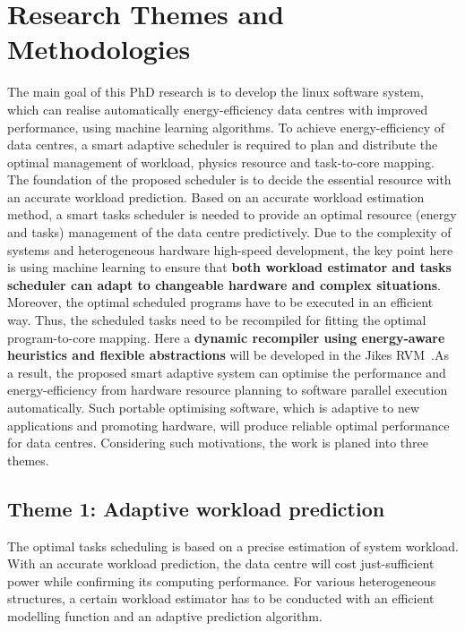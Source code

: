 \section{Research Themes and Methodologies}

The main goal of this PhD research is to develop the linux software system, which can realise automatically energy-efficiency data centres with improved performance, using machine learning algorithms. To achieve energy-efficiency of data centres, a smart adaptive scheduler is required to plan and distribute the optimal management of workload, physics resource and task-to-core mapping. The foundation of the proposed scheduler is to decide the essential resource with an accurate workload prediction. Based on an accurate workload estimation method, a smart tasks scheduler is needed to provide an optimal resource (energy and tasks) management of the data centre predictively. Due to the complexity of systems and heterogeneous hardware high-speed development, the key point here is using machine learning to ensure that \textbf{both workload estimator and tasks scheduler can adapt to changeable hardware and complex situations}. Moreover, the optimal scheduled programs have to be executed in an efficient way. Thus, the scheduled tasks need to be recompiled for fitting the optimal program-to-core mapping. Here a \textbf{dynamic recompiler using energy-aware heuristics and flexible abstractions} will be developed in the Jikes RVM~\cite{JRVM}.As a result, the proposed smart adaptive system can optimise the performance and energy-efficiency from hardware resource planning to software parallel execution automatically. Such portable optimising software, which is adaptive to new applications and promoting hardware, will produce reliable optimal performance for data centres. Considering such motivations, the work is planed into three themes.
\subsection{Theme 1: Adaptive workload prediction}
The optimal tasks scheduling is based on a precise estimation of system workload. With an accurate workload prediction, the data centre will cost just-sufficient power while confirming its computing performance. For various heterogeneous structures, a certain workload estimator has to be conducted with an efficient modelling function and an adaptive prediction algorithm.

